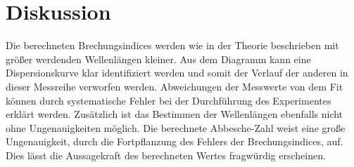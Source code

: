 \section{Diskussion}
\label{sec:Diskussion}

Die berechneten Brechungsindices werden wie in der Theorie beschrieben mit größer werdenden Wellenlängen kleiner.
Aus dem Diagramm kann eine Dispersionskurve klar identifiziert werden und somit der Verlauf der anderen in dieser
Messreihe verworfen werden. Abweichungen der Messwerte von dem Fit können durch systematische Fehler bei der Durchführung des
Experimentes erklärt werden. Zusätzlich ist das Bestimmen der Wellenlängen ebenfalls nicht ohne Ungenauigkeiten möglich.
Die berechnete Abbesche-Zahl weist eine große Ungenauigkeit, durch die Fortpflanzung des Fehlers der Brechungsindices, auf. Dies lässt die
Aussagekraft des berechneten Wertes fragwürdig erscheinen.
